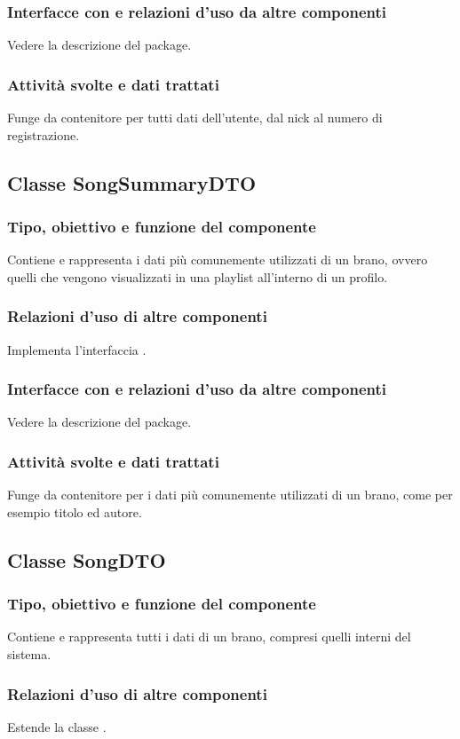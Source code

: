\subsubsection*{Interfacce con e relazioni d'uso da altre componenti}
Vedere la descrizione del package.
\subsubsection*{Attivit\`a svolte e dati trattati}
Funge da contenitore per tutti dati dell'utente, dal nick al numero di
registrazione.

\subsection{Classe SongSummaryDTO}
\subsubsection*{Tipo, obiettivo e funzione del componente}
Contiene e rappresenta i dati pi\`u comunemente utilizzati di un brano, ovvero
quelli che vengono visualizzati in una playlist all'interno di un profilo.
\subsubsection*{Relazioni d'uso di altre componenti}
Implementa l'interfaccia .
\subsubsection*{Interfacce con e relazioni d'uso da altre componenti}
Vedere la descrizione del package.
\subsubsection*{Attivit\`a svolte e dati trattati}
Funge da contenitore per i dati pi\`u comunemente utilizzati di un brano, come
per esempio titolo ed autore.

\subsection{Classe SongDTO}
\subsubsection*{Tipo, obiettivo e funzione del componente}
Contiene e rappresenta tutti i dati di un brano, compresi quelli interni del
sistema. 
\subsubsection*{Relazioni d'uso di altre componenti}
Estende la classe .
